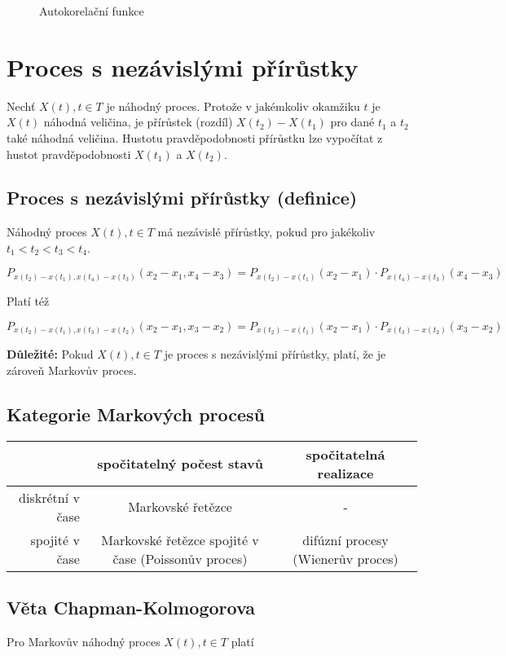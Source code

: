 \begin{figure}
\caption{Autokorelační funkce}
\end{figure}

\section{Proces s nezávislými přírůstky}
Nechť $X(t),t\in T$ je náhodný proces. Protože v jakémkoliv okamžiku $t$ je $X(t)$ náhodná veličina, je přírůstek (rozdíl) $X(t_2)-X(t_1)$ pro dané $t_1$ a $t_2$ také náhodná veličina. Hustotu pravděpodobnosti přírůstku lze vypočítat z hustot pravděpodobnosti $X(t_1)$ a $X(t_2)$.

\subsection{Proces s nezávislými přírůstky (definice)}
Náhodný proces $X(t),t\in T$ má nezávislé přírůstky, pokud pro jakékoliv $t_1<t_2<t_3<t_4$.

\[ P_{x(t_2)-x(t_1),x(t_4)-x(t_3)}(x_2-x_1,x_4-x_3)=P_{x(t_2)-x(t_1)}(x_2-x_1)\cdot P_{x(t_4)-x(t_3)}(x_4-x_3) \]

Platí též

\[ P_{x(t_2)-x(t_1),x(t_3)-x(t_2)}(x_2-x_1,x_3-x_2) = P_{x(t_2)-x(t_1)}(x_2-x_1)\cdot P_{x(t_3)-x(t_2)}(x_3-x_2) \]

\textbf{Důležité:} Pokud $X(t),t\in T$ je proces s nezávislými přírůstky, platí, že je zároveň Markovův proces.

\subsection{Kategorie Markových procesů}

\begin{table}[H]
\centering
\begin{tabular}{r|cc}
& spočitatelný počest stavů & spočitatelná realizace\\\hline
diskrétní v čase & Markovské řetězce & -\\
spojité v čase & Markovské řetězce spojité v čase (Poissonův proces) & difúzní procesy (Wienerův proces)
\end{tabular}
\end{table}

\subsection{Věta Chapman-Kolmogorova}
Pro Markovův náhodný proces $X(t),t\in T$ platí

